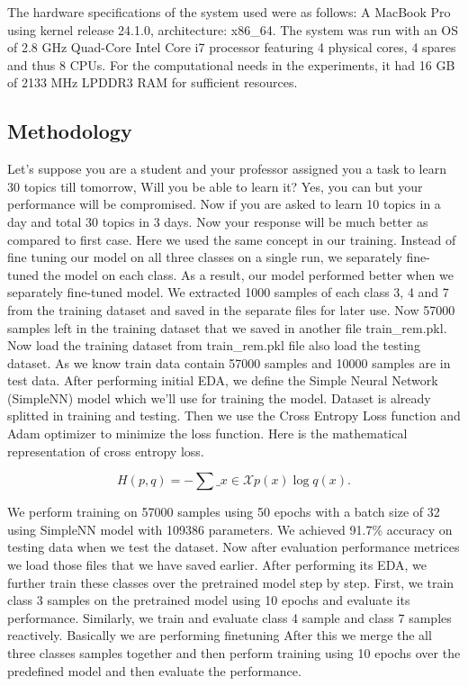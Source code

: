 \documentclass[conference]{IEEEtran}
\begin{document}
The hardware specifications of the system used were as follows: A MacBook Pro using kernel release 24.1.0, architecture: x86\_64. The system was run with an OS of 2.8 GHz Quad-Core Intel Core i7 processor featuring 4 physical cores, 4 spares and thus 8 CPUs. For the computational needs in the experiments, it had 16 GB of 2133 MHz LPDDR3 RAM for sufficient resources.

\subsection{Methodology}
Let’s suppose you are a student and your professor assigned you a task to learn 30 topics till tomorrow, Will you be able to learn it? Yes, you can but your performance will be compromised. Now if you are asked to learn 10 topics in a day and total 30 topics in 3 days. Now your response will be much better as compared to first case. Here we used the same concept in our training. Instead of fine tuning our model on all three classes on a single run, we separately fine-tuned the model on each class. As a result, our model performed better when we separately fine-tuned model. 
We extracted 1000 samples of each class 3, 4 and 7 from the training dataset and saved in the separate files for later use. Now 57000 samples left in the training dataset that we saved in another file train\_rem.pkl. Now load the training dataset from train\_rem.pkl file also load the testing dataset. As we know train data contain 57000 samples and 10000 samples are in test data. After performing initial EDA, we define the Simple Neural Network (SimpleNN) model which we’ll use for training the model. Dataset is already splitted in training and testing. Then we use the Cross Entropy Loss function and Adam optimizer to minimize the loss function. Here is the mathematical representation of cross entropy loss.

\begin{equation}
H(p, q) = - \sum\_{x \in \mathcal{X}} p(x) \log q(x).
\end{equation}

We perform training on 57000 samples using 50 epochs with a batch size of 32 using SimpleNN model with 109386 parameters. We achieved 91.7\% accuracy on testing data when we test the dataset. Now after evaluation performance metrices we load those files that we have saved earlier. After performing its EDA, we further train these classes over the pretrained model step by step. First, we train class 3 samples on the pretrained model using 10 epochs and evaluate its performance. Similarly, we train and evaluate class 4 sample and class 7 samples reactively. Basically we are performing finetuning
After this we merge the all three classes samples together and then perform training using 10 epochs over the predefined model and then evaluate the performance.
\end{document}
